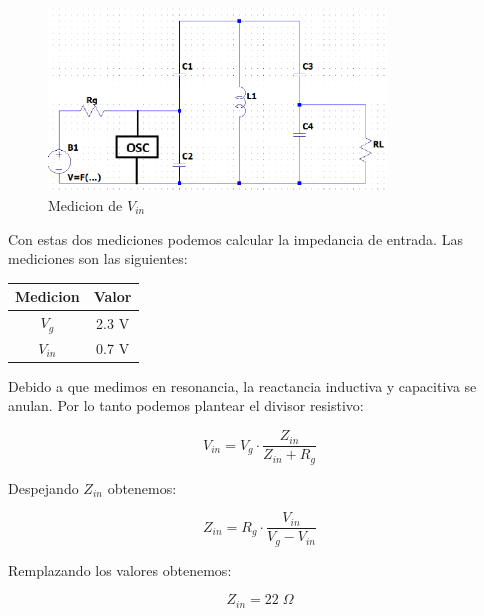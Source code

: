 \newpage

\begin{figure}[h]
    \centering
    \includegraphics[width=0.8\textwidth]{Imagenes/medicion_zin2.png}
    \caption{Medicion de $V_{in}$}
    \label{fig: de la medicion de la impedancia de entrada 2}
\end{figure}

Con estas dos mediciones podemos calcular la impedancia de entrada. Las mediciones son las siguientes:
\begin{table}[h]
    \centering
    \begin{tabular}{|c|c|}
    \hline
    \rowcolor[HTML]{C0C0C0} 
    \textbf{Medicion} & \textbf{Valor} \\ \hline
    $V_g$            & 2.3  V         \\ \hline
    $V_{in}$         & 0.7 V         \\ \hline
    \end{tabular}
\end{table}

Debido a que medimos en resonancia, la reactancia inductiva y capacitiva se anulan. Por lo tanto podemos plantear el divisor resistivo:

\begin{equation}
    V_{in} = V_g \cdot \frac{Z_{in}}{Z_{in} + R_{g}}
\end{equation}

Despejando $Z_{in}$ obtenemos:

\begin{equation}
    Z_{in} = R_g \cdot \frac{ V_{in}}{V_g - V_{in}}
\end{equation}

Remplazando los valores obtenemos:

\begin{equation}
    Z_{in} = 22\; \Omega
\end{equation}

